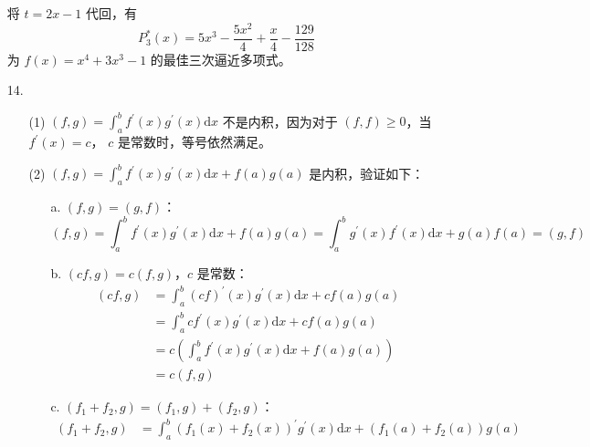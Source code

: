 \documentclass{sjtuarticle}
\def\dd{\mathrm{d}}
\begin{document}
\begin{itemize}
\begin{solution}
\begin{equation*}
        \end{equation*}
        将 $t=2x-1$ 代回，有
        \begin{equation*}
            P^*_3(x)=5 x^{3} - \frac{5 x^{2}}{4} + \frac{x}{4} - \frac{129}{128}
        \end{equation*}
        为 $f(x)=x^4+3x^3-1$ 的最佳三次逼近多项式。
    \end{solution}
    \item[14.] \begin{solution}
        \begin{itemize}
            \item[(1)] $(f,g)=\int_a^b f^\prime(x)g^\prime(x)\dd x$ 不是内积，因为对于 $(f,f)\geq 0$，当 $f^\prime(x)=c$， $c$ 是常数时，等号依然满足。
            \item[(2)] $(f,g)=\int_a^b f^\prime(x)g^\prime(x)\dd x+f(a)g(a)$ 是内积，验证如下：
            \begin{itemize}
            \item[a.] $(f,g)=(g,f)$：
                \begin{equation*}
                    (f,g)=\int_a^b f^\prime(x)g^\prime(x)\dd x + f(a)g(a)=\int_a^b g^\prime(x)f^\prime(x)\dd x + g(a)f(a)=(g,f)
                \end{equation*}
                \item[b.] $(cf,g)=c(f,g)$，$c$ 是常数：
                \begin{equation*}
                    \begin{aligned}
                        (cf,g)&=\int_a^b (cf)^\prime(x)g^\prime(x)\dd x + cf(a)g(a)\\
                        &=\int_a^b cf^\prime(x)g^\prime(x)\dd x+cf(a)g(a)\\
                        &=c\left(\int_a^b f^\prime(x)g^\prime(x)\dd x+f(a)g(a)\right)\\
                        &=c(f,g)
                    \end{aligned}
                \end{equation*}
                \item[c.] $(f_1+f_2,g)=(f_1,g)+(f_2,g)$：
                \begin{equation*}
                    \begin{aligned}
                        (f_1+f_2,g)&=\int_a^b (f_1(x)+f_2(x))^\prime g^\prime(x)\dd x+(f_1(a)+f_2(a))g(a)\\

\end{aligned}
\end{equation*}
\end{itemize}
\end{itemize}
\end{solution}
\end{itemize}
\end{document}
